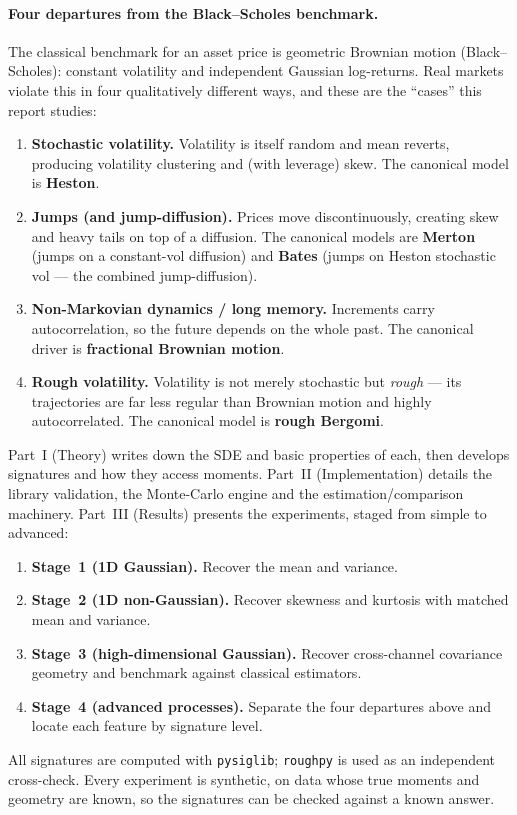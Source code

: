 \documentclass[11pt]{article}
\newcommand{\code}[1]{\texttt{#1}}
\begin{document}
\paragraph{Four departures from the Black--Scholes benchmark.}
The classical benchmark for an asset price is geometric Brownian motion
(Black--Scholes): constant volatility and independent Gaussian log-returns. Real
markets violate this in four qualitatively different ways, and these are the
``cases'' this report studies:
\begin{enumerate}
  \item \textbf{Stochastic volatility.} Volatility is itself random and mean
        reverts, producing volatility clustering and (with leverage) skew. The
        canonical model is \textbf{Heston}.
  \item \textbf{Jumps (and jump-diffusion).} Prices move discontinuously,
        creating skew and heavy tails on top of a diffusion. The canonical models
        are \textbf{Merton} (jumps on a constant-vol diffusion) and \textbf{Bates}
        (jumps on Heston stochastic vol --- the combined jump-diffusion).
  \item \textbf{Non-Markovian dynamics / long memory.} Increments carry
        autocorrelation, so the future depends on the whole past. The canonical
        driver is \textbf{fractional Brownian motion}.
  \item \textbf{Rough volatility.} Volatility is not merely stochastic but
        \emph{rough} --- its trajectories are far less regular than Brownian
        motion and highly autocorrelated. The canonical model is
        \textbf{rough Bergomi}.
\end{enumerate}
Part~I (Theory) writes down the SDE and basic properties of each, then develops
signatures and how they access moments. Part~II (Implementation) details the
library validation, the Monte-Carlo engine and the estimation/comparison
machinery. Part~III (Results) presents the experiments, staged from simple to
advanced:
\begin{enumerate}
  \item \textbf{Stage~1 (1D Gaussian).} Recover the mean and variance.
  \item \textbf{Stage~2 (1D non-Gaussian).} Recover skewness and kurtosis with
        matched mean and variance.
  \item \textbf{Stage~3 (high-dimensional Gaussian).} Recover cross-channel
        covariance geometry and benchmark against classical estimators.
  \item \textbf{Stage~4 (advanced processes).} Separate the four departures above
        and locate each feature by signature level.
\end{enumerate}
All signatures are computed with \code{pysiglib}; \code{roughpy} is used as an
independent cross-check. Every experiment is synthetic, on data whose true
moments and geometry are known, so the signatures can be checked against a known
answer.
\end{document}
